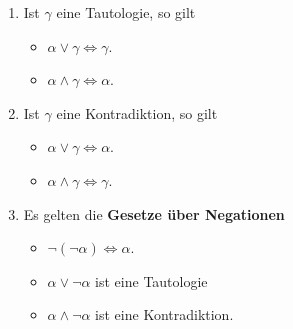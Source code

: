 \begin{satz}
\begin{enumerate}
\item Ist $\gamma$ eine Tautologie, so gilt

\begin{itemize}
\item $\alpha \vee \gamma \iff \gamma$.
\item $\alpha \wedge \gamma \iff \alpha $.
\end{itemize}

\item Ist $\gamma$ eine Kontradiktion, so gilt

\begin{itemize}
\item $\alpha \vee \gamma \iff \alpha$.
\item $\alpha \wedge \gamma \iff \gamma $.
\end{itemize}

\item Es gelten die \textbf{Gesetze über Negationen}

\begin{itemize}
\item $\neg ( \neg \alpha) \iff \alpha$.
\item $\alpha \vee \neg \alpha$ ist eine Tautologie
\item $\alpha \wedge \neg \alpha $ ist eine Kontradiktion.
\end{itemize}
\end{enumerate} 
 
\end{satz}


